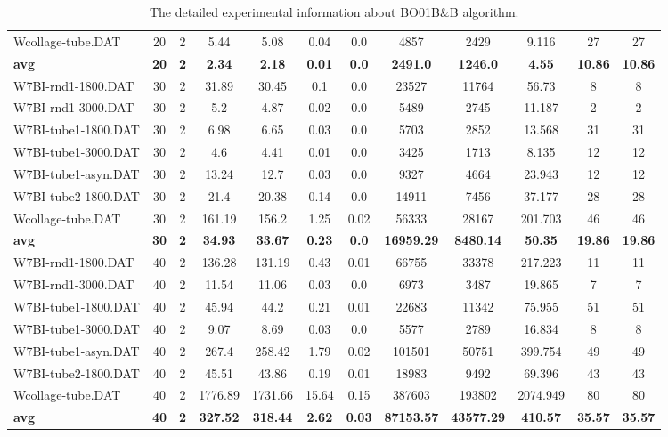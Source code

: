 \begin{table}[!h]
{\begin{tabular}{lccccccccccc}
Wcollage-tube.DAT & 20 & 2 & 5.44 & 5.08 & 0.04 & 0.0 & 4857 & 2429 & 9.116 & 27 & 27\\
\cline{1-12} \textbf{avg} & \textbf{20} & \textbf{2} & \textbf{2.34} & \textbf{2.18} & \textbf{0.01} & \textbf{0.0} & \textbf{2491.0} & \textbf{1246.0} & \textbf{4.55} & \textbf{10.86} & \textbf{10.86} \\ \cline{1-12}
W7BI-rnd1-1800.DAT & 30 & 2 & 31.89 & 30.45 & 0.1 & 0.0 & 23527 & 11764 & 56.73 & 8 & 8\\
W7BI-rnd1-3000.DAT & 30 & 2 & 5.2 & 4.87 & 0.02 & 0.0 & 5489 & 2745 & 11.187 & 2 & 2\\
W7BI-tube1-1800.DAT & 30 & 2 & 6.98 & 6.65 & 0.03 & 0.0 & 5703 & 2852 & 13.568 & 31 & 31\\
W7BI-tube1-3000.DAT & 30 & 2 & 4.6 & 4.41 & 0.01 & 0.0 & 3425 & 1713 & 8.135 & 12 & 12\\
W7BI-tube1-asyn.DAT & 30 & 2 & 13.24 & 12.7 & 0.03 & 0.0 & 9327 & 4664 & 23.943 & 12 & 12\\
W7BI-tube2-1800.DAT & 30 & 2 & 21.4 & 20.38 & 0.14 & 0.0 & 14911 & 7456 & 37.177 & 28 & 28\\
Wcollage-tube.DAT & 30 & 2 & 161.19 & 156.2 & 1.25 & 0.02 & 56333 & 28167 & 201.703 & 46 & 46\\
\cline{1-12} \textbf{avg} & \textbf{30} & \textbf{2} & \textbf{34.93} & \textbf{33.67} & \textbf{0.23} & \textbf{0.0} & \textbf{16959.29} & \textbf{8480.14} & \textbf{50.35} & \textbf{19.86} & \textbf{19.86} \\ \cline{1-12}
W7BI-rnd1-1800.DAT & 40 & 2 & 136.28 & 131.19 & 0.43 & 0.01 & 66755 & 33378 & 217.223 & 11 & 11\\
W7BI-rnd1-3000.DAT & 40 & 2 & 11.54 & 11.06 & 0.03 & 0.0 & 6973 & 3487 & 19.865 & 7 & 7\\
W7BI-tube1-1800.DAT & 40 & 2 & 45.94 & 44.2 & 0.21 & 0.01 & 22683 & 11342 & 75.955 & 51 & 51\\
W7BI-tube1-3000.DAT & 40 & 2 & 9.07 & 8.69 & 0.03 & 0.0 & 5577 & 2789 & 16.834 & 8 & 8\\
W7BI-tube1-asyn.DAT & 40 & 2 & 267.4 & 258.42 & 1.79 & 0.02 & 101501 & 50751 & 399.754 & 49 & 49\\
W7BI-tube2-1800.DAT & 40 & 2 & 45.51 & 43.86 & 0.19 & 0.01 & 18983 & 9492 & 69.396 & 43 & 43\\
Wcollage-tube.DAT & 40 & 2 & 1776.89 & 1731.66 & 15.64 & 0.15 & 387603 & 193802 & 2074.949 & 80 & 80\\
\cline{1-12} \textbf{avg} & \textbf{40} & \textbf{2} & \textbf{327.52} & \textbf{318.44} & \textbf{2.62} & \textbf{0.03} & \textbf{87153.57} & \textbf{43577.29} & \textbf{410.57} & \textbf{35.57} & \textbf{35.57} \\ \cline{1-12}
\bottomrule
\end{tabular}%
}%
\caption{The detailed experimental information about BO01B\&B algorithm.}
\label{tab:table_bb}
\end{table}

